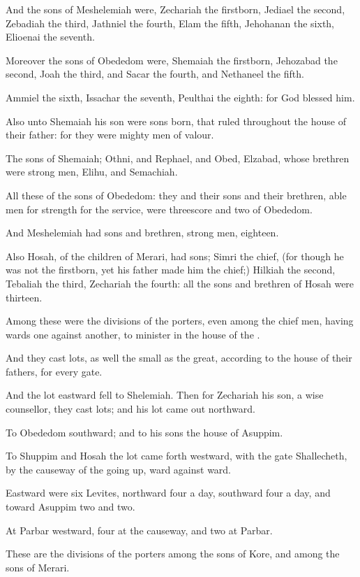 \verse And the sons of Meshelemiah were, Zechariah the firstborn, Jediael the second, Zebadiah the third, Jathniel the fourth, \verse Elam the fifth, Jehohanan the sixth, Elioenai the seventh.

\verse Moreover the sons of Obededom were, Shemaiah the firstborn, Jehozabad the second, Joah the third, and Sacar the fourth, and Nethaneel the fifth.

\verse Ammiel the sixth, Issachar the seventh, Peulthai the eighth: for God blessed him.

\verse Also unto Shemaiah his son were sons born, that ruled throughout the house of their father: for they were mighty men of valour.

\verse The sons of Shemaiah; Othni, and Rephael, and Obed, Elzabad, whose brethren were strong men, Elihu, and Semachiah.

\verse All these of the sons of Obededom: they and their sons and their brethren, able men for strength for the service, were threescore and two of Obededom.

\verse And Meshelemiah had sons and brethren, strong men, eighteen.

\verse Also Hosah, of the children of Merari, had sons; Simri the chief, (for though he was not the firstborn, yet his father made him the chief;) \verse Hilkiah the second, Tebaliah the third, Zechariah the fourth: all the sons and brethren of Hosah were thirteen.

\verse Among these were the divisions of the porters, even among the chief men, having wards one against another, to minister in the house of the \LORD.

\verse And they cast lots, as well the small as the great, according to the house of their fathers, for every gate.

\verse And the lot eastward fell to Shelemiah. Then for Zechariah his son, a wise counsellor, they cast lots; and his lot came out northward.

\verse To Obededom southward; and to his sons the house of Asuppim.

\verse To Shuppim and Hosah the lot came forth westward, with the gate Shallecheth, by the causeway of the going up, ward against ward.

\verse Eastward were six Levites, northward four a day, southward four a day, and toward Asuppim two and two.

\verse At Parbar westward, four at the causeway, and two at Parbar.

\verse These are the divisions of the porters among the sons of Kore, and among the sons of Merari.

